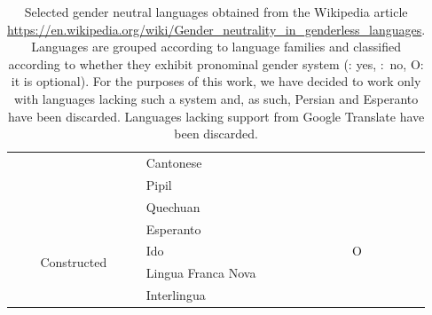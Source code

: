 \documentclass[fleqn,10pt]{article}
\newcommand{\xmark}{\ding{53}}%
\begin{document}
\begin{table}[H]
\begin{small}
\begin{tabular}{|c|m{2cm}|m{2cm}|c|c|}
									& Cantonese 			& \xmark 					& \xmark		& \xmark		\\
									& Pipil 				& \xmark 					& \xmark		& \xmark		\\
									& Quechuan 				& \xmark 					& \xmark		& \xmark		\\ \hline
	\multirow{4}{*}{Constructed} 	& Esperanto 			& \checkmark 				& \checkmark 	& \xmark		\\
									& Ido 					& O 						& \xmark 		& \xmark 		\\ \cline{2-2}
									& Lingua Franca Nova 	& \xmark 					& \xmark 		& \xmark 		\\ \cline{2-2}
									& Interlingua 			& \xmark 					& \xmark 		& \xmark 		\\ \hline
	\end{tabular}
	\caption{Selected gender neutral languages obtained from the Wikipedia article \url{https://en.wikipedia.org/wiki/Gender_neutrality_in_genderless_languages}. Languages are grouped according to language families and classified according to whether they exhibit pronominal gender system (\checkmark: yes, \xmark:~no, O: it is optional). For the purposes of this work, we have decided to work only with languages lacking such a system and, as such, Persian and Esperanto have been discarded. Languages lacking support from Google Translate have been discarded.}
	\label{tab:gender-neutral-languages}
	\end{small}
\end{table}
\end{document}

